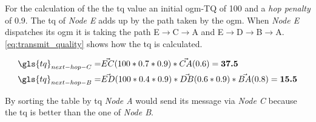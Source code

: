 For the calculation of the the \gls{tq} value an initial \gls{ogm}-\gls{TQ} of 100 and a \textit{hop penalty} of 0.9.
The \gls{tq} of \textit{Node E} adds up by the path taken by the \gls{ogm}.
When \textit{Node E} dispatches its \gls{ogm} it is taking the path E$\rightarrow$C$\rightarrow$A and E$\rightarrow$D$\rightarrow$B$\rightarrow$A. \vref{eq:transmit_quality} shows how the \gls{tq} is calculated.

\begin{equation}
\label{eq:transmit_quality}
\begin{aligned}
\gls{tq} _{next-hop-C} = & \vec{EC} (100 * 0.7 * 0.9) * \vec{CA} (0.6) = \textbf{37.5} \\
\gls{tq} _{next-hop-B} = & \vec{ED} (100 * 0.4 * 0.9) * \vec{DB} (0.6 * 0.9) * \vec{BA} (0.8) = \textbf{15.5}
\end{aligned}
\end{equation}

By sorting the table by \gls{tq} \textit{Node A} would send its message via \textit{Node C} because the \gls{tq} is better than the one of \textit{Node B}.
